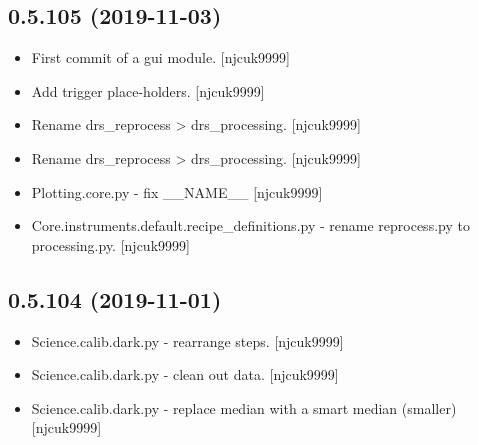 \documentclass[a4paper,10pt,english]{report}
\begin{document}
\subsection{0.5.105 (2019-11-03)}
\label{\detokenize{misc/changelog:id36}}\begin{itemize}
\item {} 
First commit of a gui module. {[}njcuk9999{]}

\item {} 
Add trigger place-holders. {[}njcuk9999{]}

\item {} 
Rename drs\_reprocess \textendash{}\textgreater{} drs\_processing. {[}njcuk9999{]}

\item {} 
Rename drs\_reprocess \textendash{}\textgreater{} drs\_processing. {[}njcuk9999{]}

\item {} 
Plotting.core.py - fix \_\_NAME\_\_ {[}njcuk9999{]}

\item {} 
Core.instruments.default.recipe\_definitions.py - rename reprocess.py
to processing.py. {[}njcuk9999{]}

\end{itemize}


\subsection{0.5.104 (2019-11-01)}
\label{\detokenize{misc/changelog:id37}}\begin{itemize}
\item {} 
Science.calib.dark.py - rearrange steps. {[}njcuk9999{]}

\item {} 
Science.calib.dark.py - clean out data. {[}njcuk9999{]}

\item {} 
Science.calib.dark.py - replace median with a smart median (smaller)
{[}njcuk9999{]}

\end{itemize}
\end{document}

